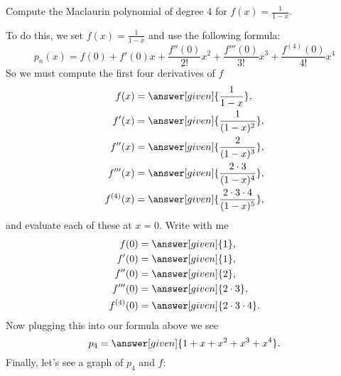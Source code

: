 \documentclass{ximera}
\begin{document}
\begin{example}
  Compute the Maclaurin polynomial of degree $4$ for $f(x) =
  \frac{1}{1-x}$.
  \begin{explanation}
    To do this, we set $f(x) =\frac{1}{1-x}$ and use the following formula:
    \[
    p_n(x) = f(0) + f'(0)x +\frac{f''(0)}{2!}x^2+\frac{f'''(0)}{3!}x^3+\frac{f^{(4)}(0)}{4!}x^4
    \]
    So we must compute the first four derivatives of $f$
    \begin{align*}
      f(x) &= \answer[given]{\frac{1}{1-x}},\\
      f'(x) &= \answer[given]{\frac{1}{(1-x)^2}},\\
      f''(x) &= \answer[given]{\frac{2}{(1-x)^3}},\\
      f'''(x) &= \answer[given]{\frac{2\cdot 3}{(1-x)^4}},\\
      f^{(4)}(x) &= \answer[given]{\frac{2\cdot 3\cdot 4}{(1-x)^5}},
    \end{align*}
    and evaluate each of these at $x=0$. Write with me
    \begin{align*}
      f(0) &= \answer[given]{1},\\
      f'(0) &= \answer[given]{1},\\
      f''(0) &= \answer[given]{2},\\
      f'''(0) &=\answer[given]{2\cdot 3},\\
      f^{(4)}(0) &= \answer[given]{2\cdot 3\cdot 4}.
    \end{align*}
    Now plugging this into our formula above we see
    \[
    p_4 = \answer[given]{1 + x + x^2 + x^3 + x^4}.
    \]
    Finally, let's see a graph of $p_4$ and $f$:
      \begin{image}
  \end{image}
  \end{explanation}
\end{example}
\end{document}
